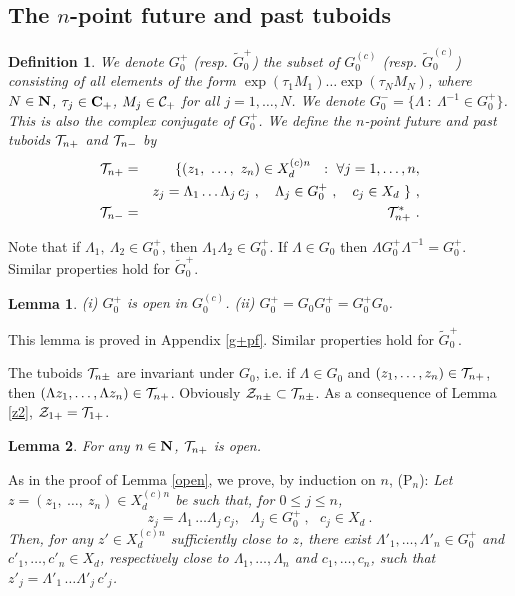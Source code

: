 \documentclass[a4paper,a4paper]{article}
\newtheorem{definition}{Definition}[section]
\newtheorem{lemma}{Lemma}[section]
\def\bC{{\bf C}}
\def\bN{{\bf N}}
\def\CC{{\cal C}}
\def\TT{{\cal T}}
\def\ZZ{{\cal Z}}
\def\wt{\widetilde}
\def\HB{\hfill\break}
\def\Xcdn{X_d^{(c)n}}
\begin{document}
\subsection{The $n$-point future and past tuboids}

\label{TBIG}
\begin{definition}
\label{bigs}
We denote $G_0^+$ (resp. $\wt G_0^+$)
the subset of $G_0^{(c)}$ (resp. $\wt G_0^{(c)}$) consisting
of all elements of the form $\exp(\tau_1 M_1)\ldots \exp(\tau_N M_N)$,
where $N \in \bN$, $\tau_j \in \bC_+$, $M_j \in \CC_+$ for all
$j = 1,\ldots,N$.
We denote $G_0^- = \{\Lambda\ :\ \Lambda^{-1} \in G_0^+\}$.
This is also the complex conjugate of $G_0^+$.
We define the $n$-point future and past tuboids $\TT_{n+}$ and $\TT_{n-}$
by
\begin{eqnarray}
\TT_{n+} &=& \{(z_1,\ \ldots,\ z_n) \in \Xcdn\
\ :\ \forall j = 1,\ldots,n,\nonumber\\
&& z_j = \Lambda_1\ldots \Lambda_j\,c_j\ ,\ \ \
\Lambda_j \in G_0^+\ , \ \ \
c_j \in X_d\  \}\ ,\nonumber\\
\TT_{n-} &=& \TT_{n+}^*\ .
\label{3.12}\end{eqnarray}
\end{definition}
Note that if
$\Lambda_1,\ \Lambda_2 \in G_0^+$, then $\Lambda_1\Lambda_2 \in G_0^+$.
If $\Lambda \in G_0$ then $\Lambda G_0^+ \Lambda^{-1} = G_0^+$. Similar
properties hold for $\wt G_0^+$.

\begin{lemma}
\label{g+open}\HB
(i) $G_0^+$ is open in $G_0^{(c)}$.\HB
(ii) $G_0^+ = G_0 G_0^+ = G_0^+  G_0 $.
\end{lemma}
This lemma is proved in Appendix \ref{g+pf}. Similar properties hold for
$\wt G_0^+$.

The tuboids $\TT_{n\pm}$ are invariant under $G_0$, i.e.
if $\Lambda \in G_0$ and $(z_1,\ldots,z_n) \in \TT_{n+}$,
then $(\Lambda z_1,\ldots,\Lambda z_n) \in \TT_{n+}$.
Obviously $\ZZ_{n\pm} \subset \TT_{n\pm}$. As a consequence of
Lemma \ref{z2}, $\ZZ_{1+} = \TT_{1+}$.

\begin{lemma}
\label{bopen}
For any $n \in \bN$, $\TT_{n+}$ is open.
\end{lemma}

As in the proof of Lemma \ref{open}, we prove, by induction on $n$,\HB
(P$_n$):
{\it Let $z = (z_1,\ \ldots,\ z_n) \in \Xcdn$ be such that,
for $0 \le j \le n$,
\begin{equation}
z_j = \Lambda_1\,\ldots\Lambda_j\,c_j,
\ \ \ \Lambda_j \in G_0^+\ ,\ \ \ c_j \in X_d\ .
\label{3.14}\end{equation}
Then, for any $z' \in \Xcdn$ sufficiently close to $z$, there exist
$\Lambda'_1,\ldots,\Lambda'_n \in G_0^+$ and $c'_1,\ldots,c'_n \in X_d$,
respectively
close to $\Lambda_1,\ldots,\Lambda_n$ and $c_1,\ldots,c_n$, such that
$z'_j = \Lambda'_1\,\ldots\Lambda'_j\,c'_j$.}
\end{document}
